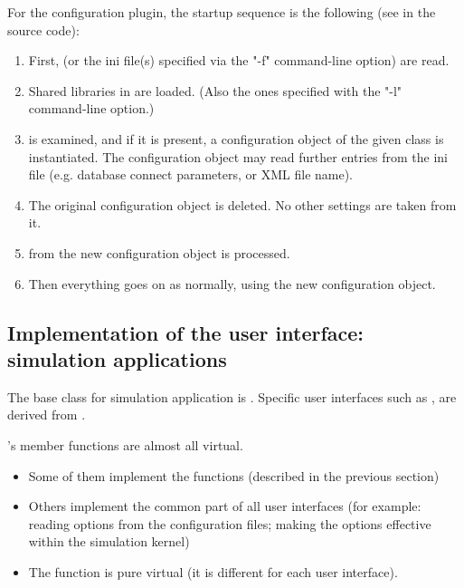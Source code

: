 For the configuration plugin, the startup sequence is the following
(see  in the source code):

\begin{enumerate}
  \item First,  (or the ini file(s) specified via the "-f"
     command-line option) are read.
  \item Shared libraries in  are loaded.
     (Also the ones specified with the "-l" command-line option.)
  \item {} is examined, and if it is present,
     a configuration object of the given class is instantiated.
     The configuration object may read further entries from the
     ini file (e.g. database connect parameters, or XML file name).
  \item The original   configuration
     object is deleted. No other settings are taken from it.
  \item {} from the new configuration object is
     processed.
  \item Then everything goes on as normally, using the new configuration
     object.
\end{enumerate}



\subsection{Implementation of the user interface: simulation applications}

The base class for simulation application is .
Specific user interfaces such as ,
 are derived from .

's member functions are almost all virtual.
\begin{itemize}
  \item{Some of them implement the  functions
    (described in the previous section)}
  \item{Others implement the common part of all user interfaces (for
    example: reading options from the configuration files; making the
    options effective within the simulation kernel)}
  \item{The  function is pure virtual (it is different
    for each user interface).}
\end{itemize}

